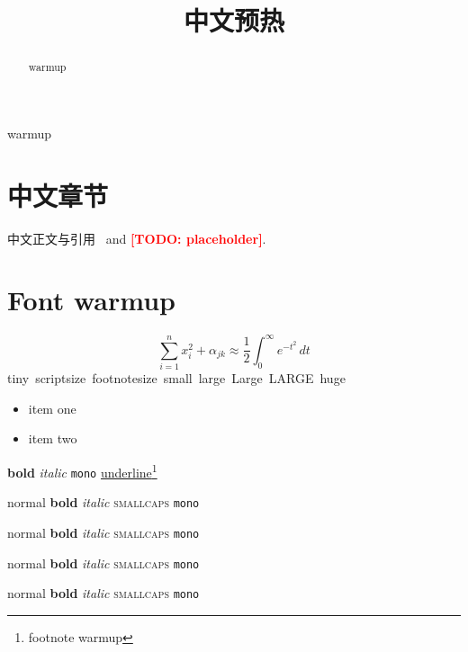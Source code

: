 \documentclass[conference]{IEEEtran}
\providecommand{\todo}[1]{\textcolor{red}{\textbf{[TODO: #1]}}}
\begin{document}
\title{中文预热}\author{}
\maketitle
\begin{abstract}warmup\end{abstract}
\begin{IEEEkeywords}warmup\end{IEEEkeywords}
\section{中文章节}
中文正文与引用~\cite{warmup2020sample} and \todo{placeholder}.

\section{Font warmup}
\begin{equation}\label{eq:warm}
  \sum_{i=1}^{n} x_i^{2} + \alpha_{jk} \approx \frac{1}{2}\int_0^\infty e^{-t^2}\,dt
\end{equation}
{\tiny tiny}\ {\scriptsize scriptsize}\ {\footnotesize footnotesize}\ {\small small}\
{\large large}\ {\Large Large}\ {\LARGE LARGE}\ {\huge huge}
\begin{itemize}\item item one\item item two\end{itemize}
\textbf{bold} \textit{italic} \texttt{mono} \underline{underline}\footnote{footnote warmup}


{\tiny normal} {\tiny \textbf{bold}} {\tiny \textit{italic}} {\tiny \textsc{smallcaps}} {\tiny \texttt{mono}}

{\scriptsize normal} {\scriptsize \textbf{bold}} {\scriptsize \textit{italic}} {\scriptsize \textsc{smallcaps}} {\scriptsize \texttt{mono}}

{\footnotesize normal} {\footnotesize \textbf{bold}} {\footnotesize \textit{italic}} {\footnotesize \textsc{smallcaps}} {\footnotesize \texttt{mono}}

{\small normal} {\small \textbf{bold}} {\small \textit{italic}} {\small \textsc{smallcaps}} {\small \texttt{mono}}
\end{document}

